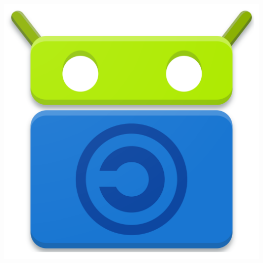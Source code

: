 \begin{frame}
    \begin{columns}[c]
            \begin{center}
                \includegraphics[height=0.15\textheight]{images/fdroid-logo.png}

\end{center}
\end{columns}
\end{frame}
